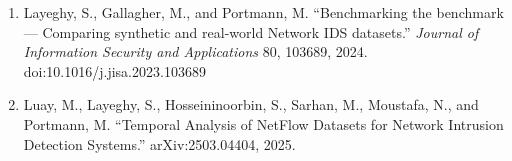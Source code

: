 \documentclass[11pt,a4paper]{article}
\begin{document}
\begin{enumerate}[leftmargin=*,itemsep=2pt]
\item Layeghy, S., Gallagher, M., and Portmann, M. ``Benchmarking the benchmark --- Comparing synthetic and real-world Network IDS datasets.'' \emph{Journal of Information Security and Applications} 80, 103689, 2024. doi:10.1016/j.jisa.2023.103689
\item Luay, M., Layeghy, S., Hosseininoorbin, S., Sarhan, M., Moustafa, N., and Portmann, M. ``Temporal Analysis of NetFlow Datasets for Network Intrusion Detection Systems.'' arXiv:2503.04404, 2025.
\end{enumerate}
\end{document}
